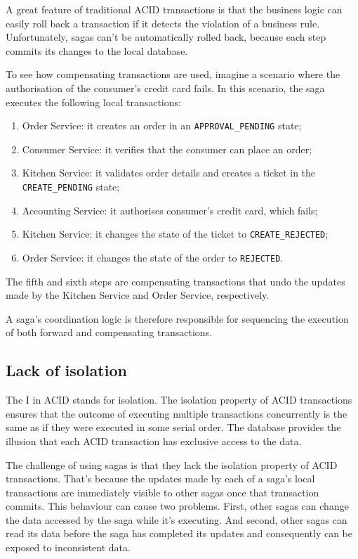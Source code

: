 \documentclass[conference]{IEEEtran}
\begin{document}
A great feature of traditional ACID transactions is that the business logic can easily roll back a transaction if it detects the violation of a business rule. Unfortunately, sagas can’t be automatically rolled back, because each step commits its changes to the local database. 

To see how compensating transactions are used, imagine a scenario where the authorisation of the consumer’s credit card fails. In this scenario, the saga executes the following local transactions:

\begin{enumerate}
  \item Order Service: it creates an order in an \texttt{APPROVAL\_PENDING} state;
  \item Consumer Service: it verifies that the consumer can place an order;
  \item Kitchen Service: it validates order details and creates a ticket in the \texttt{CREATE\_PENDING} state;
  \item Accounting Service: it authorises consumer’s credit card, which fails;
  \item Kitchen Service: it changes the state of the ticket to \texttt{CREATE\_REJECTED};
  \item Order Service: it changes the state of the order to \texttt{REJECTED}.
\end{enumerate}

The fifth and sixth steps are compensating transactions that undo the updates made by the Kitchen Service and Order Service, respectively.

A saga’s coordination logic is therefore responsible for sequencing the execution of both forward and compensating transactions. \cite{microservices-patterns-saga}

\subsection{Lack of isolation}

The I in ACID stands for isolation. The isolation property of ACID transactions ensures that the outcome of executing multiple transactions concurrently is the same as if they were executed in some serial order. The database provides the illusion that each ACID transaction has exclusive access to the data.

The challenge of using sagas is that they lack the isolation property of ACID transactions. That’s because the updates made by each of a saga’s local transactions are immediately visible to other sagas once that transaction commits. This behaviour can cause two problems. First, other sagas can change the data accessed by the saga while it’s executing. And second, other sagas can read its data before the saga has completed its updates and consequently can be exposed to inconsistent data.
\end{document}
